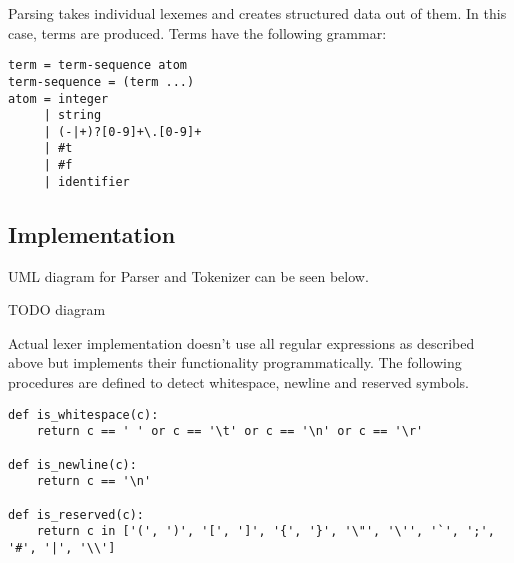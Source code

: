 Parsing takes individual lexemes and creates structured data out of them. In this case, terms are produced. Terms have the following grammar:

\begin{lstlisting}
term = term-sequence atom
term-sequence = (term ...) 
atom = integer 
	 | string
	 | (-|+)?[0-9]+\.[0-9]+
	 | #t
	 | #f
	 | identifier
\end{lstlisting}


\subsection{Implementation}

UML diagram for Parser and Tokenizer can be seen below.

TODO diagram


Actual lexer implementation doesn't use all regular expressions as described above but implements their functionality programmatically. The following procedures are defined to detect whitespace, newline and reserved symbols.

\begin{lstlisting}
def is_whitespace(c):
    return c == ' ' or c == '\t' or c == '\n' or c == '\r'

def is_newline(c):
    return c == '\n'

def is_reserved(c): 
    return c in ['(', ')', '[', ']', '{', '}', '\"', '\'', '`', ';', '#', '|', '\\']
\end{lstlisting}


